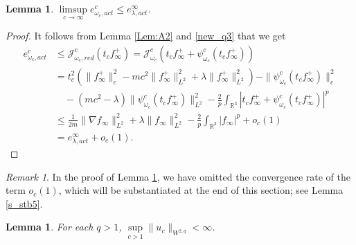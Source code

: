 \documentclass{amsart}
\theoremstyle{plain}
\newtheorem{lemma}[theorem]{Lemma}
\theoremstyle{definition}
\theoremstyle{remark}
\newtheorem*{rem*}{Remark}
\numberwithin{equation}{section} \numberwithin{figure}{section}
\begin{document}
\begin{lemma}\label{rem_stb3}
    $\limsup\limits_{c\to \infty}e_{\omega_c, act}^c\leq e_{\lambda,act}^\infty$.
\end{lemma}
\begin{proof}
    It follows from Lemma \ref{Lem:A2} and \eqref{new_q3} that we get
    \begin{equation}
        \begin{split}
         e_{\omega_c, act}^c&\leq \mathcal{J}_{\omega_c, red}^c(t_c f_\infty^+)  =\mathcal{J}^c_{\omega_c}(t_c f_\infty^++ \psi_{\omega_c}^c(t_c f_\infty^+))\\
          &=
          t_c^2\left(\|f_\infty^+\|_c^2  -mc^2\|f_\infty^+\|_{L^2}^2+ \lambda\|f_\infty^+\|_{L^2}^2 \right)- \|\psi_{\omega_c}^c(t_c f_\infty^+)\|_c^2\\
          &\quad -(mc^2-\lambda)\|\psi_{\omega_c}^c(t_c f_\infty^+)\|_{L^2}^2 - \frac{2}{p}\int_{\mathbb{R}^3}|t_c f_\infty^++ \psi_{\omega_c}^c(t_c f_\infty^+)|^p\\
          &\leq\frac{1}{2m}\|\nabla f_\infty\|_{L^2}^2 + \lambda\|f_\infty\|_{L^2}^2 -\frac{2}{p}\int_{\mathbb{R}^3}| f_\infty|^p +o_c(1)\\
          &= e_{\lambda,act}^{\infty}+ o_c(1).
        \end{split}
    \end{equation}
\end{proof}
\begin{rem*}
    In the proof of Lemma \ref{rem_stb3}, we have omitted the convergence rate of the term \( o_c(1) \), which will be substantiated at the end of this section; see Lemma \ref{s_stb5}.

\end{rem*}
\begin{lemma}\label{A_51}
  For each $q>1$,  $\sup\limits_{c>1}\|u_c\|_{W^{2,q}}<\infty$.

\end{lemma}
\end{document}
